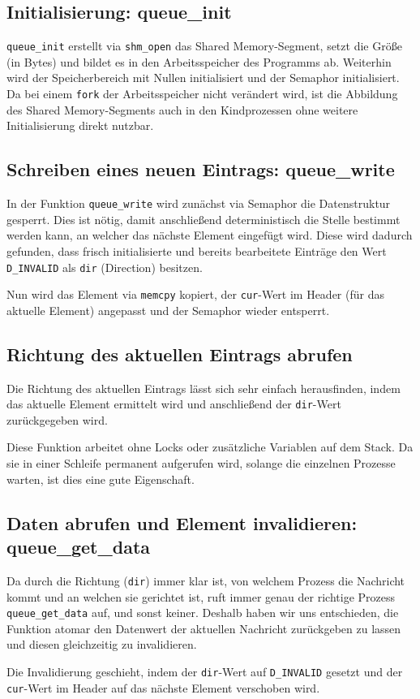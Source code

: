 \documentclass[12pt, a4paper]{scrartcl}
\begin{document}
\subsection{Initialisierung: queue\_init}

\texttt{queue\_init} erstellt via \texttt{shm\_open} das Shared Memory-Segment,
setzt die Größe (in Bytes) und bildet es in den Arbeitsspeicher des Programms
ab. Weiterhin wird der Speicherbereich mit Nullen initialisiert und der
Semaphor initialisiert. Da bei einem \texttt{fork} der Arbeitsspeicher nicht
verändert wird, ist die Abbildung des Shared Memory-Segments auch in den
Kindprozessen ohne weitere Initialisierung direkt nutzbar.

\subsection{Schreiben eines neuen Eintrags: queue\_write}

In der Funktion \texttt{queue\_write} wird zunächst via Semaphor die
Datenstruktur gesperrt. Dies ist nötig, damit anschließend deterministisch die
Stelle bestimmt werden kann, an welcher das nächste Element eingefügt wird.
Diese wird dadurch gefunden, dass frisch initialisierte und bereits bearbeitete
Einträge den Wert \texttt{D\_INVALID} als \texttt{dir} (Direction) besitzen.
\np

Nun wird das Element via \texttt{memcpy} kopiert, der \texttt{cur}-Wert im
Header (für das aktuelle Element) angepasst und der Semaphor wieder entsperrt.

\subsection{Richtung des aktuellen Eintrags abrufen}

Die Richtung des aktuellen Eintrags lässt sich sehr einfach herausfinden, indem
das aktuelle Element ermittelt wird und anschließend der \texttt{dir}-Wert
zurückgegeben wird.
\np

Diese Funktion arbeitet ohne Locks oder zusätzliche Variablen auf dem Stack. Da
sie in einer Schleife permanent aufgerufen wird, solange die einzelnen Prozesse
warten, ist dies eine gute Eigenschaft.

\subsection{Daten abrufen und Element invalidieren: queue\_get\_data}

Da durch die Richtung (\texttt{dir}) immer klar ist, von welchem Prozess die
Nachricht kommt und an welchen sie gerichtet ist, ruft immer genau der richtige
Prozess \texttt{queue\_\-get\_\-data} auf, und sonst keiner. Deshalb haben wir uns
entschieden, die Funktion atomar den Datenwert der aktuellen Nachricht
zurückgeben zu lassen und diesen gleichzeitig zu invalidieren.
\np

Die Invalidierung geschieht, indem der \texttt{dir}-Wert auf
\texttt{D\_INVALID} gesetzt und der \texttt{cur}-Wert im Header auf das nächste
Element verschoben wird.
\end{document}
